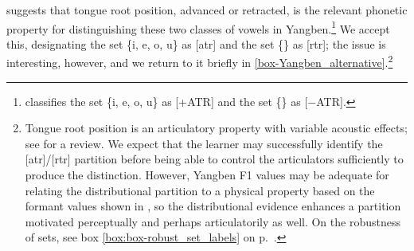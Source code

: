 \citet{Boyd:2015} suggests that  tongue root position, advanced or retracted, is the relevant phonetic property for distinguishing these two classes of vowels in Yangben.\footnote{\citet{Boyd:2015} classifies the set \{i, e, o, u\} as [+ATR] and  the set \{\} as [$-$ATR].\label{Boyd-ATR-RTR_note} } We accept this, designating the set \{i, e, o, u\} as [atr] and the set \{\} as [rtr]; the issue is interesting, however, and we return to it briefly in \textsection\ref{box-Yangben_alternative}.\footnote{Tongue root position is an articulatory property with variable acoustic effects; see \citet{Warren:2014} for a review. We expect that the learner may successfully identify the [atr]/[rtr] partition before being able to control the articulators sufficiently to produce the distinction. However,  Yangben  F1 values may be adequate for relating the distributional partition to a physical property based on the formant values shown in , so the distributional evidence enhances a partition motivated perceptually and perhaps articulatorily as well. On the robustness of sets, see box {\ref{box:box-robust_set_labels}} on p.\ \pageref{box:box-robust_set_labels}. }


